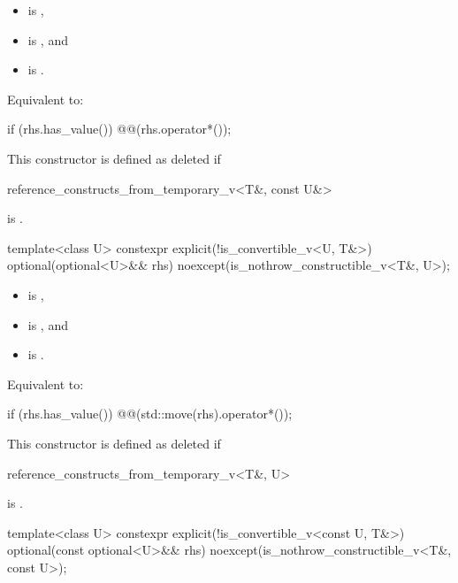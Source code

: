 \begin{itemdescr}
\pnum
\constraints
\begin{itemize}
\item {} is ,
\item {} is , and
\item {} is .
\end{itemize}

\pnum
\effects
Equivalent to:
\begin{codeblock}
if (rhs.has_value()) @@(rhs.operator*());
\end{codeblock}

\pnum
\remarks
This constructor is defined as deleted if
\begin{codeblock}
reference_constructs_from_temporary_v<T&, const U&>
\end{codeblock}
is .
\end{itemdescr}

\begin{itemdecl}
template<class U>
  constexpr explicit(!is_convertible_v<U, T&>)
  optional(optional<U>&& rhs) noexcept(is_nothrow_constructible_v<T&, U>);
\end{itemdecl}

\begin{itemdescr}
\pnum
\constraints
\begin{itemize}
\item {} is ,
\item {} is , and
\item {} is .
\end{itemize}

\pnum
\effects
Equivalent to:
\begin{codeblock}
if (rhs.has_value()) @@(std::move(rhs).operator*());
\end{codeblock}

\pnum
\remarks
This constructor is defined as deleted if
\begin{codeblock}
reference_constructs_from_temporary_v<T&, U>
\end{codeblock}
is .
\end{itemdescr}

\begin{itemdecl}
template<class U>
  constexpr explicit(!is_convertible_v<const U, T&>)
  optional(const optional<U>&& rhs) noexcept(is_nothrow_constructible_v<T&, const U>);
\end{itemdecl}

